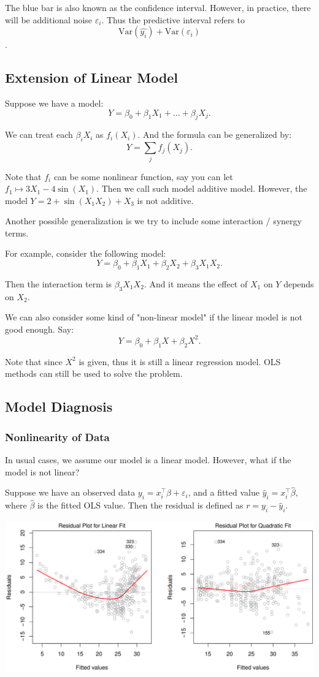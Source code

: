 \documentclass{article}
\theoremstyle{MyNonumberplain}
\theoremstyle{break}
\newcommand{\ve}{\varepsilon}
\newcommand{\var}{\text{Var}}
\newcommand{\T}{^\intercal}
\newcommand{\bt}[1]{\beta_{#1}}
\theoremstyle{break}
\theoremstyle{break}
\theoremstyle{break}
\begin{document}
The blue bar is also known as the confidence interval. However, in practice, there will be additional noise $\ve_i$.
Thus the predictive interval refers to $$\var(\hat{y_i})+\var(\ve_i)$$.

\subsection{Extension of Linear Model}

Suppose we have a model:
$$Y=\bt{0}+\bt{1}X_1+...+\bt{j}X_j.$$

We can treat each $\bt{i}X_i$ as $f_i(X_i)$. And the formula can be generalized by:
$$Y=\sum_j f_j(X_j).$$

Note that $f_i$ can be some nonlinear function, say you can let $f_1\mapsto 3X_1-4\sin(X_1)$. Then we call such model additive model. 
However, the model $Y=2+\sin(X_1X_2)+X_3$ is not additive.

Another possible generalization is we try to include some interaction / synergy terms.

For example, consider the following model:
$$Y=\bt{0}+\bt{1}X_1+\bt{2}X_2+\bt{3}X_1X_2.$$

Then the interaction term is $\bt{3}X_1X_2$. And it means the effect of $X_1$ on $Y$ depends on $X_2$.

We can also consider some kind of "non-linear model" if the linear model is not good enough. Say:
$$Y=\bt{0}+\bt{1}X+\bt{2}X^2.$$

Note that since $X^2$ is given, thus it is still a linear regression model. OLS methods can still be used to solve the problem.

\subsection{Model Diagnosis}

\subsubsection{Nonlinearity of Data}

In usual cases, we assume our model is a linear model. However, what if the model is not linear?

Suppose we have an observed data $y_i=x_i\T\beta+\ve_i$, and a fitted value $\hat{y}_i=x_i\T\hat\beta$, where $\hat\beta$ is the fitted OLS value. 
Then the residual is defined as $r=y_i-\hat{y}_i$. 

\includegraphics[scale=0.2]{Images/img10.png}
\end{document}
